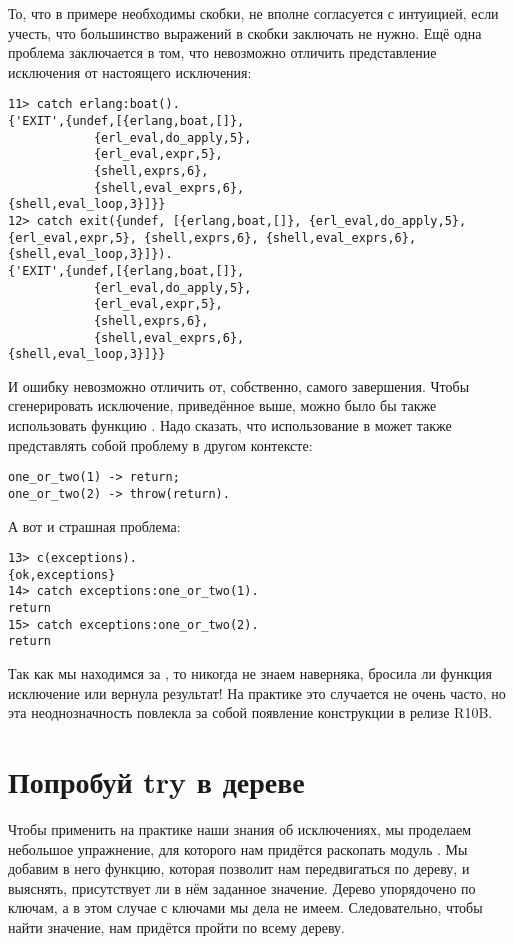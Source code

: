 То, что в примере необходимы скобки, не вполне согласуется с интуицией, если учесть, что большинство выражений в скобки заключать не нужно.
Ещё одна проблема заключается в том, что невозможно отличить представление исключения от настоящего исключения:
\begin{lstlisting}[style=erlang]
11> catch erlang:boat().
{'EXIT',{undef,[{erlang,boat,[]},
            {erl_eval,do_apply,5},
            {erl_eval,expr,5},
            {shell,exprs,6},
            {shell,eval_exprs,6},
{shell,eval_loop,3}]}}
12> catch exit({undef, [{erlang,boat,[]}, {erl_eval,do_apply,5}, {erl_eval,expr,5}, {shell,exprs,6}, {shell,eval_exprs,6}, {shell,eval_loop,3}]}).
{'EXIT',{undef,[{erlang,boat,[]},
            {erl_eval,do_apply,5},
            {erl_eval,expr,5},
            {shell,exprs,6},
            {shell,eval_exprs,6},
{shell,eval_loop,3}]}}
\end{lstlisting}

И ошибку невозможно отличить от, собственно, самого завершения.
Чтобы сгенерировать исключение, приведённое выше, можно было бы также использовать функцию .
Надо сказать, что использование  в  может также представлять собой проблему в другом контексте:
\begin{lstlisting}[style=erlang]
one_or_two(1) -> return;
one_or_two(2) -> throw(return).
\end{lstlisting}

А вот и страшная проблема:
\begin{lstlisting}[style=erlang]
13> c(exceptions).
{ok,exceptions}
14> catch exceptions:one_or_two(1).
return
15> catch exceptions:one_or_two(2).
return
\end{lstlisting}

Так как мы находимся за , то никогда не знаем наверняка, бросила ли функция исключение или вернула результат!
На практике это случается не очень часто, но эта неоднозначность повлекла за собой появление конструкции  в релизе R10B.
\section{Попробуй try в дереве}
\label{try-a-try-in-a-tree}
Чтобы применить на практике наши знания об исключениях, мы проделаем небольшое упражнение, для которого нам придётся раскопать модуль .
Мы добавим в него функцию, которая позволит нам передвигаться по дереву, и выяснять, присутствует ли в нём заданное значение.
Дерево упорядочено по ключам, а в этом случае с ключами мы дела не имеем.
Следовательно, чтобы найти значение, нам придётся пройти по всему дереву.

